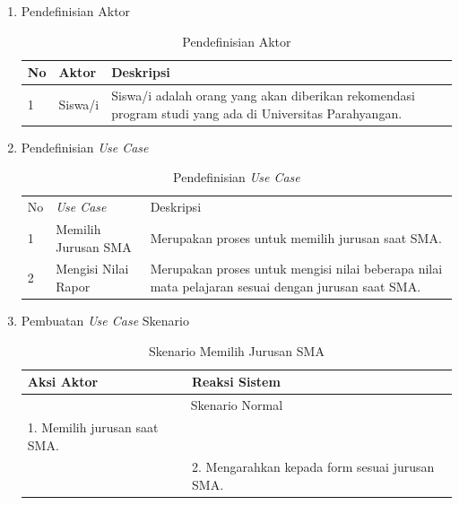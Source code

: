 \begin{enumerate}
    \item Pendefinisian Aktor
    
    \begin{table}[H]
        \centering
        \begin{tabular}{|p{1cm}|p{4cm}|p{8cm}|}
            \hline
            No & Aktor & Deskripsi  \\
            \hline
            1 & Siswa/i &  Siswa/i adalah orang yang akan diberikan rekomendasi program studi yang ada di Universitas Parahyangan.\\
            \hline
        \end{tabular}
        \caption{Pendefinisian Aktor}
        \label{tab:pendefsian aktor}
    \end{table}
    
    \item Pendefinisian \textit{Use Case}
    
    \begin{table}[H]
        \centering
        \begin{tabular}{|p{1cm}|p{4cm}|p{8cm}|}
            \hline
            No & \textit{Use Case} & Deskripsi  \\
            1 & Memilih Jurusan SMA & Merupakan proses untuk memilih jurusan saat SMA. \\
            \hline
            2 & Mengisi Nilai Rapor & Merupakan proses untuk mengisi nilai beberapa nilai mata pelajaran sesuai dengan jurusan saat SMA. \\ 
            \hline
        \end{tabular}
        \caption{Pendefinisian \textit{Use Case}}
        \label{tab:pendefinisian use case}
    \end{table}
    
    \item Pembuatan \textit{Use Case} Skenario
    
    \begin{table}[H]
        \centering
        \begin{tabular}{|p{6.5cm}|p{6.5cm}|}
            \hline
            Aksi Aktor & Reaksi Sistem \\
            \hline
            \multicolumn{2}{|c|}{Skenario Normal}\\
            \hline
            1. Memilih jurusan saat SMA. & \\
            \hline
             & 2. Mengarahkan kepada form sesuai jurusan SMA. \\
            \hline
        \end{tabular}
        \caption{Skenario Memilih Jurusan SMA}
        \label{tab:skenario memilih jurusan sma}
    \end{table}
    

\end{enumerate}
